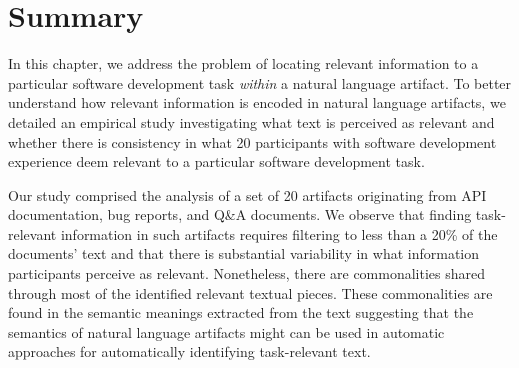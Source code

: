 \section{Summary}
\label{cp3:summary}



In this chapter, we address the problem of locating relevant information
to a particular software development task \textit{within} a natural language artifact.
To better understand how relevant information is encoded in natural language artifacts,
we detailed an empirical study investigating what text is perceived as relevant
and whether there is consistency in what 20 participants with software development experience deem relevant
to a particular software development task.


Our study comprised the analysis of a set of 20 artifacts originating from API documentation, bug reports, and Q\&A documents.
We observe that finding task-relevant information in such artifacts requires filtering to less than
a 20\% of the documents' text and that there is substantial variability in what information participants perceive as relevant.
Nonetheless, there are commonalities shared through most of the identified relevant textual pieces.
These commonalities are found in the semantic meanings extracted from the text suggesting that
the semantics of natural language artifacts might 
can be used in automatic approaches for 
automatically identifying task-relevant text.
